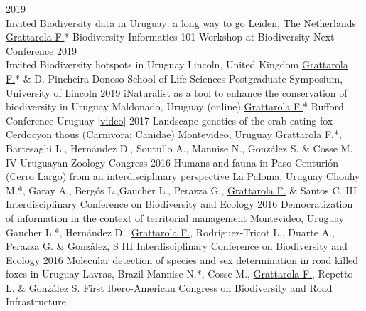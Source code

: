\documentclass[9pt]{developercv} %
\begin{document}
\begin{entrylist}
	\entrylong
		{2019\\\footnotesize{Invited}}
		{Biodiversity data in Uruguay: a long way to go}
		{Leiden, The Netherlands}
		{\underline{Grattarola F.}* \slashsep Biodiversity Informatics 101 Workshop at Biodiversity Next Conference}
	\entrylong
		{2019\\\footnotesize{Invited}}
		{Biodiversity hotspots in Uruguay}
		{Lincoln, United Kingdom}
		{\underline{Grattarola F.}* \& D. Pincheira-Donoso \slashsep School of Life Sciences Postgraduate Symposium, University of Lincoln}
	\entrylong
		{2019}
		{iNaturalist as a tool to enhance the conservation of biodiversity in Uruguay}
		{Maldonado, Uruguay (online)}
		{\underline{Grattarola F.}* \slashsep Rufford Conference Uruguay  [\href{https://youtu.be/3_lM-gPNLWY}{video}]}
	\entrylong
		{2017}
		{Landscape genetics of the crab-eating fox Cerdocyon thous (Carnivora: Canidae)}
		{Montevideo, Uruguay}
		{\underline{Grattarola F.}*, Bartesaghi L., Hernández D., Soutullo A., Mannise N., González S. \& Cosse M. \slashsep IV Uruguayan Zoology Congress}
	\entrylong
		{2016}
		{Humans and fauna in Paso Centurión (Cerro Largo) from an interdisciplinary perspective}
		{La Paloma, Uruguay}
		{Chouhy M.*, Garay A., Bergós L.,Gaucher L., Perazza G., \underline{Grattarola F.} \& Santos C. \slashsep III Interdisciplinary Conference on Biodiversity and Ecology}
	\entrylong
		{2016}
		{Democratization of information in the context of territorial management}
		{Montevideo, Uruguay}
		{Gaucher L.*, Hernández D., \underline{Grattarola F.}, Rodriguez-Tricot L., Duarte A., Perazza G. \& González, S \slashsep III Interdisciplinary Conference on Biodiversity and Ecology}
	\entrylong
		{2016}
		{Molecular detection of species and sex determination in road killed foxes in Uruguay}
		{Lavras, Brazil}
		{Mannise N.*, Cosse M., \underline{Grattarola F.}, Repetto L. \& González S. \slashsep First Ibero-American Congress on Biodiversity and Road Infrastructure}		
\end{entrylist}




\end{document}

